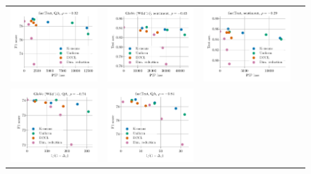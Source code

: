 \begin{figure}
\begin{tabular}{@{\hskip -0.0in}c@{\hskip -0.0in}c@{\hskip -0.0in}c@{\hskip -0.0in}c@{\hskip -0.0in}}
		\includegraphics[width=.245\linewidth]{figures/fasttext1m_qa_best-f1_vs_gram-large-dim-frob-error_linx_stoc_ave-pt.pdf} &
		\includegraphics[width=.245\linewidth]{figures/glove400k_sentiment_sst_test-acc_vs_gram-large-dim-frob-error_linx_stoc_ave-pt.pdf} &
		\includegraphics[width=.245\linewidth]{figures/fasttext1m_sentiment_sst_test-acc_vs_gram-large-dim-frob-error_linx_stoc_ave-pt.pdf} \\
		\includegraphics[width=.245\linewidth]{figures/glove400k_qa_best-f1_vs_gram-large-dim-delta1-2-trans_linx_stoc_ave-pt.pdf} &
		\includegraphics[width=.245\linewidth]{figures/fasttext1m_qa_best-f1_vs_gram-large-dim-delta1-2-trans_linx_stoc_ave-pt.pdf} &

\end{tabular}
\end{figure}
